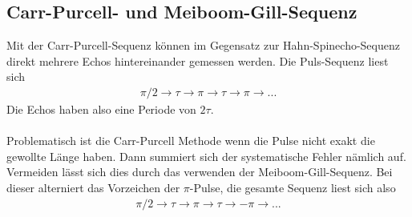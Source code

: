 \subsection{Carr-Purcell- und Meiboom-Gill-Sequenz}
Mit der Carr-Purcell-Sequenz können im Gegensatz zur Hahn-Spinecho-Sequenz direkt mehrere Echos hintereinander gemessen werden. Die Puls-Sequenz liest sich
\begin{align*}
  \pi/2 \rightarrow \tau \rightarrow \pi \rightarrow \tau \rightarrow \pi \rightarrow ... 
\end{align*}
Die Echos haben also eine Periode von $2\tau$. \\ \\
Problematisch ist die Carr-Purcell Methode wenn die Pulse nicht exakt die gewollte Länge haben. Dann summiert sich der systematische Fehler nämlich auf. Vermeiden lässt sich dies durch das verwenden der Meiboom-Gill-Sequenz. Bei dieser alterniert das Vorzeichen der $\pi$-Pulse, die gesamte Sequenz liest sich also 
\begin{align*}
  \pi/2 \rightarrow \tau \rightarrow \pi \rightarrow \tau \rightarrow -\pi \rightarrow ... 
\end{align*}
